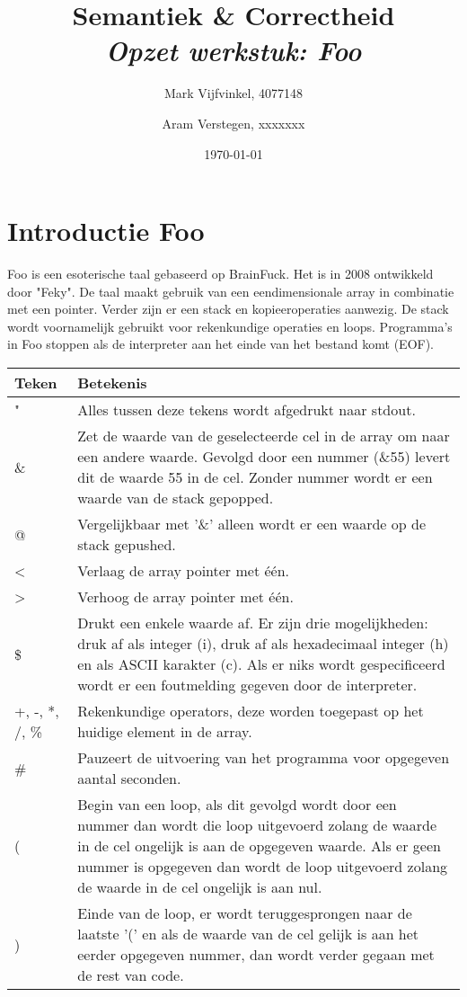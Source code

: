 \documentclass[11pt]{article}
\title{\textbf{Semantiek \& Correctheid \\ \emph{Opzet werkstuk: Foo}}}
\author{
	Mark Vijfvinkel, 4077148
	\and Aram Verstegen, xxxxxxx
}
\date{\today}
\begin{document}
\maketitle


\section{Introductie Foo}

Foo is een esoterische taal gebaseerd op BrainFuck. Het is in 2008 ontwikkeld door "Feky". De taal maakt gebruik van een eendimensionale array in combinatie met een pointer. Verder zijn er een stack en kopieeroperaties aanwezig. De stack wordt voornamelijk gebruikt voor rekenkundige operaties en loops. Programma's in Foo stoppen als de interpreter aan het einde van het bestand komt (EOF).

\begin{center}
    \begin{tabular}{ | l | p{15cm} |}
    \hline
    Teken & Betekenis \\ \hline
    " & Alles tussen deze tekens wordt afgedrukt naar stdout. \\ \hline
    \& & Zet de waarde van de geselecteerde cel in de array om naar een andere waarde. Gevolgd door een nummer (\&55) levert dit de waarde 55 in de cel. Zonder nummer wordt er een waarde van de stack gepopped. \\ \hline
    @ & Vergelijkbaar met '\&' alleen wordt er een waarde op de stack gepushed. \\ \hline
    < & Verlaag de array pointer met één. \\ \hline
    > & Verhoog de array pointer met één. \\ \hline
    \$ & Drukt een enkele waarde af. Er zijn drie mogelijkheden: druk af als integer (i), druk af als hexadecimaal integer (h) en als ASCII karakter (c). Als er niks wordt gespecificeerd wordt er een foutmelding gegeven door de interpreter. \\ \hline
    +, -, *, /, \% & Rekenkundige operators, deze worden toegepast op het huidige element in de array. \\ \hline
    \# & Pauzeert de uitvoering van het programma voor opgegeven aantal seconden. \\ \hline
    ( & Begin van een loop, als dit gevolgd wordt door een nummer dan wordt die loop uitgevoerd zolang de waarde in de cel ongelijk is aan de opgegeven waarde. Als er geen nummer is opgegeven dan wordt de loop uitgevoerd zolang de waarde in de cel ongelijk is aan nul. \\ \hline
    ) & Einde van de loop, er wordt teruggesprongen naar de laatste '(' en als de waarde van de cel gelijk is aan het eerder opgegeven nummer, dan wordt verder gegaan met de rest van code. \\ \hline
  

    \hline
    \end{tabular}
\end{center}
\end{document}
